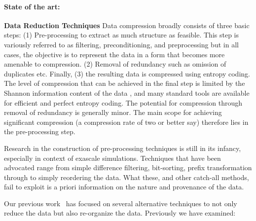 \paragraph{State of the art:} {\bf Data Reduction Techniques} Data compression
broadly consists of three basic steps: (1) Pre-processing to extract as much
structure as feasible. This step is variously referred to as filtering,
preconditioning, and preprocessing but in all cases, the objective is to
represent the data in a form that becomes more amenable to compression.  (2)
Removal of redundancy such as omission of duplicates etc.  Finally, (3) the
resulting data is compressed using entropy coding. The level of compression
that can be achieved in the final step is limited by the Shannon information
content of the data \cite{Gray:book}, and many standard tools are available for
efficient and perfect entropy coding. The potential for compression through
removal of redundancy is generally minor. The main scope for achieving
significant compression (a compression rate of two or better say) therefore
lies in the pre-processing step.

Research in the construction of pre-processing techniques is still in its
infancy, especially in context of exascale simulations. Techniques that have
been advocated range from simple difference filtering, bit-sorting, prefix
transformation through to simply reordering the data.  What these, and other
catch-all methods, fail to exploit is a priori information on the nature and
provenance of the data. 

Our previous
work~\cite{lakshminarasimhan2011compressing,lakshminarasimhan2011compressing,%
gong2012multi,jenkins2012byte,gong2013parlo,boyuka2014transparent,%
tang2014improving}
has focused on several alternative techniques to not only reduce the data
but also re-organize the data. Previously we have examined:


